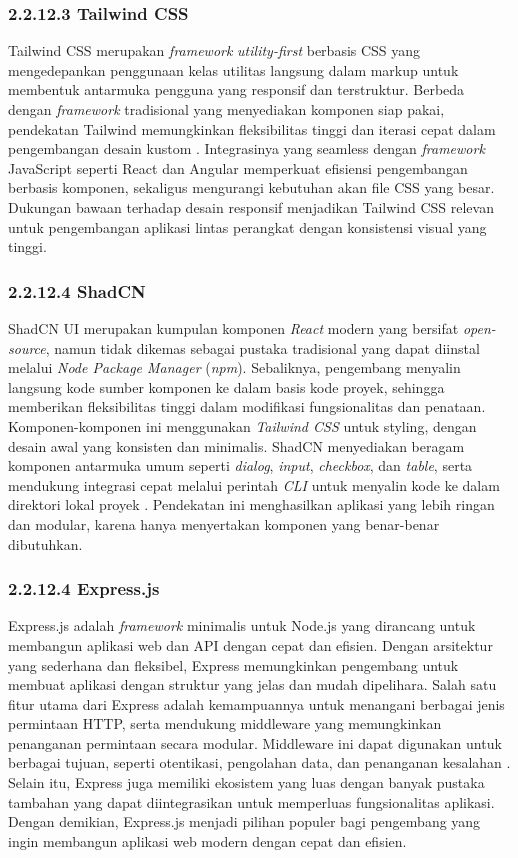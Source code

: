 \subsubsection{2.2.12.3 Tailwind CSS}

Tailwind CSS merupakan \emph{framework} \emph{utility-first} berbasis CSS yang mengedepankan penggunaan kelas utilitas langsung dalam markup untuk membentuk antarmuka pengguna yang responsif dan terstruktur. Berbeda dengan \emph{framework} tradisional yang menyediakan komponen siap pakai, pendekatan Tailwind memungkinkan fleksibilitas tinggi dan iterasi cepat dalam pengembangan desain kustom \cite{Azhariyah2024}. Integrasinya yang seamless dengan \emph{framework} JavaScript seperti React dan Angular memperkuat efisiensi pengembangan berbasis komponen, sekaligus mengurangi kebutuhan akan file CSS yang besar. Dukungan bawaan terhadap desain responsif menjadikan Tailwind CSS relevan untuk pengembangan aplikasi lintas perangkat dengan konsistensi visual yang tinggi.

\subsubsection{2.2.12.4 ShadCN}

ShadCN UI merupakan kumpulan komponen \emph{React} modern yang bersifat \emph{open-source}, namun tidak dikemas sebagai pustaka tradisional yang dapat diinstal melalui \emph{Node Package Manager} (\emph{npm}). Sebaliknya, pengembang menyalin langsung kode sumber komponen ke dalam basis kode proyek, sehingga memberikan fleksibilitas tinggi dalam modifikasi fungsionalitas dan penataan. Komponen-komponen ini menggunakan \emph{Tailwind CSS} untuk styling, dengan desain awal yang konsisten dan minimalis. ShadCN menyediakan beragam komponen antarmuka umum seperti \emph{dialog}, \emph{input}, \emph{checkbox}, dan \emph{table}, serta mendukung integrasi cepat melalui perintah \emph{CLI} untuk menyalin kode ke dalam direktori lokal proyek \cite{Shadcn2024}. Pendekatan ini menghasilkan aplikasi yang lebih ringan dan modular, karena hanya menyertakan komponen yang benar-benar dibutuhkan.

\subsubsection{2.2.12.4 Express.js}
Express.js adalah \emph{framework} minimalis untuk Node.js yang dirancang untuk membangun aplikasi web dan API dengan cepat dan efisien. Dengan arsitektur yang sederhana dan fleksibel, Express memungkinkan pengembang untuk membuat aplikasi dengan struktur yang jelas dan mudah dipelihara. Salah satu fitur utama dari Express adalah kemampuannya untuk menangani berbagai jenis permintaan HTTP, serta mendukung middleware yang memungkinkan penanganan permintaan secara modular. Middleware ini dapat digunakan untuk berbagai tujuan, seperti otentikasi, pengolahan data, dan penanganan kesalahan \cite{express2023docs}. Selain itu, Express juga memiliki ekosistem yang luas dengan banyak pustaka tambahan yang dapat diintegrasikan untuk memperluas fungsionalitas aplikasi. Dengan demikian, Express.js menjadi pilihan populer bagi pengembang yang ingin membangun aplikasi web modern dengan cepat dan efisien.

